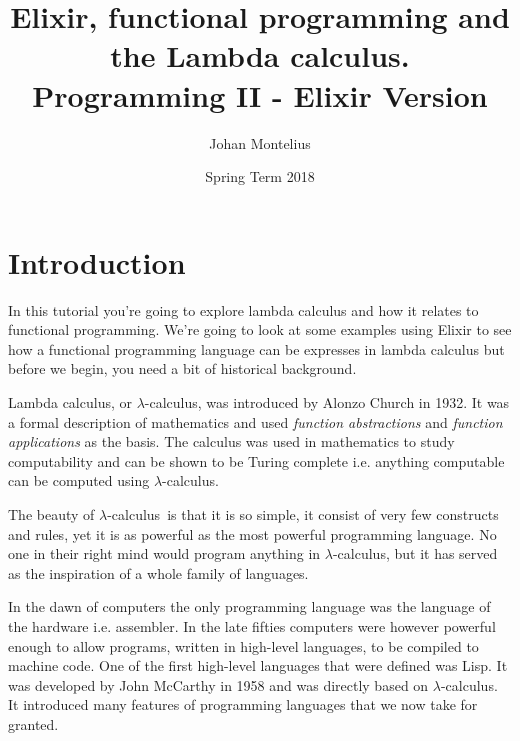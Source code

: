 \documentclass[a4paper,11pt]{article}
\newcommand{\lamc}[0]{$\lambda$-calculus}
\begin{document}

\title{
    \textbf{Elixir, functional programming and\\ the Lambda calculus.}\\
    \large{Programming II - Elixir Version}
}
\author{Johan Montelius}
\date{Spring Term 2018}
\maketitle
\thispagestyle{fancy}



\section*{Introduction}

In this tutorial you're going to explore lambda calculus and how it
relates to functional programming. We're going to look at some
examples using Elixir to see how a functional programming language can
be expresses in lambda calculus but before we begin, you need a bit of
historical background.

Lambda calculus, or \lamc, was introduced by Alonzo Church in 1932. It
was a formal description of mathematics and used {\em function abstractions}
and {\em function applications} as the basis. The calculus was used in
mathematics to study computability and can be shown to be Turing
complete i.e. anything computable can be computed using \lamc.


The beauty of \lamc\ is that it is so simple, it consist of very few
constructs and rules, yet it is as powerful as the most powerful
programming language. No one in their right mind would program
anything in \lamc, but it has served as the inspiration of a whole
family of languages.

In the dawn of computers the only programming language was the language of
the hardware i.e. assembler. In the late fifties computers were
however powerful enough to allow programs, written in high-level
languages, to be compiled to machine code. One of the first high-level
languages that were defined was Lisp. It was developed by John
McCarthy in 1958 and was directly based on \lamc. It introduced many
features of programming languages that we now take for granted.
\end{document}

